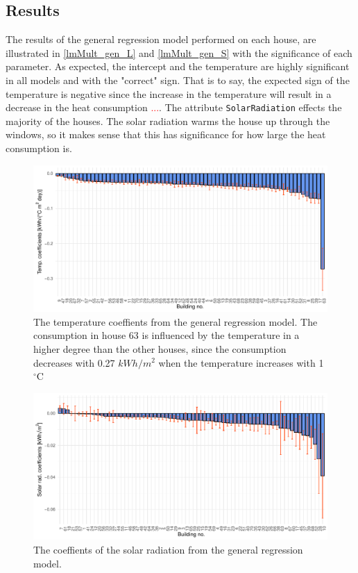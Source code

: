 \subsection{Results}
The results of the general regression model performed on each house, are illustrated in \cref{lmMult_gen_L} and \cref{lmMult_gen_S} with the significance of each parameter. As expected, the intercept and the temperature are highly significant in all models and with the "correct" sign. That is to say, the expected sign of the temperature is negative since the increase in the temperature will result in a decrease in the heat consumption \textcolor{red}{...}. The attribute \texttt{SolarRadiation} effects the majority of the houses. The solar radiation warms the house up through the windows, so it makes sense that this has significance for how large the heat consumption is.

\begin{figure}
    \centering
    \includegraphics[width=1.\textwidth]{../../../figures/Temp_coef.pdf}
    \caption{The temperature coeffients from the general regression model. The consumption in house 63 is influenced by the temperature in a higher degree than the other houses, since the consumption decreases with 0.27 $kWh/m^2$ when the temperature increases with 1 $^{\circ}$C}
    \label{fig: Temp_coef}
\end{figure}
\begin{figure}
    \centering
    \includegraphics[width=1.\textwidth]{../../../figures/Solar_coef.pdf}
    \caption{The coeffients of the solar radiation from the general regression model.}
    \label{fig: Solar_coef}
\end{figure}

